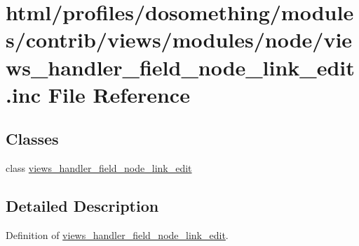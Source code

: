 \hypertarget{views__handler__field__node__link__edit_8inc}{
\section{html/profiles/dosomething/modules/contrib/views/modules/node/views\_\-handler\_\-field\_\-node\_\-link\_\-edit.inc File Reference}
\label{views__handler__field__node__link__edit_8inc}
}
\subsection*{Classes}
\begin{DoxyCompactItemize}
\item 
class \hyperlink{classviews__handler__field__node__link__edit}{views\_\-handler\_\-field\_\-node\_\-link\_\-edit}
\end{DoxyCompactItemize}


\subsection{Detailed Description}
Definition of \hyperlink{classviews__handler__field__node__link__edit}{views\_\-handler\_\-field\_\-node\_\-link\_\-edit}. 